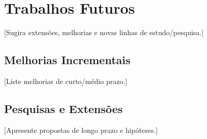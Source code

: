 \section{Trabalhos Futuros}

[Sugira extensões, melhorias e novas linhas de estudo/pesquisa.]

\subsection{Melhorias Incrementais}
[Liste melhorias de curto/médio prazo.]

\subsection{Pesquisas e Extensões}
[Apresente propostas de longo prazo e hipóteses.]
